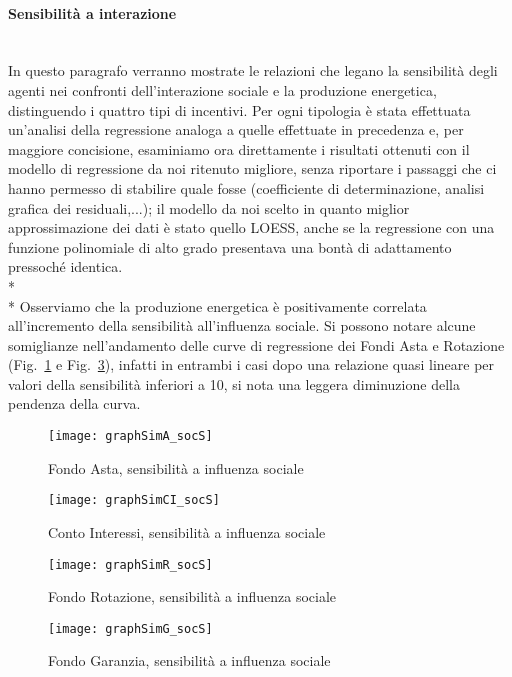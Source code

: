 \documentclass[12pt,a4paper,openright,twoside]{report}
\newcommand{\myparagraph}[1]{\paragraph{#1}\mbox{}\\}
\begin{document}
\myparagraph{Sensibilità a interazione}

In questo paragrafo verranno mostrate le relazioni che legano la sensibilità degli agenti nei confronti dell'interazione sociale e la produzione energetica, distinguendo i quattro tipi di incentivi. Per ogni tipologia è stata effettuata un'analisi della regressione analoga a quelle effettuate in precedenza e, per maggiore concisione, esaminiamo ora direttamente i risultati ottenuti con il modello di regressione da noi ritenuto migliore, senza riportare i passaggi che ci hanno permesso di stabilire quale fosse (coefficiente di determinazione, analisi grafica dei residuali,...); il modello da noi scelto in quanto miglior approssimazione dei dati è stato quello LOESS, anche se la regressione con una funzione polinomiale di alto grado presentava una bontà di adattamento pressoché identica.\\* \\*
Osserviamo che  la produzione energetica è positivamente correlata all'incremento della sensibilità all'influenza sociale. Si possono notare alcune somiglianze nell'andamento delle curve di regressione dei Fondi Asta e Rotazione (Fig.~\ref{graphAsocS} e Fig.~\ref{graphRsocS}), infatti in entrambi i casi dopo una relazione quasi lineare per valori della sensibilità inferiori a 10, si nota una leggera diminuzione della pendenza della curva. 

\begin{figure}[H]
	\centering
	\texttt{[image: graphSimA\_socS]}
	\caption{Fondo Asta, sensibilità a influenza sociale}
	\label{graphAsocS}
\end{figure}

\begin{figure}[hbt]
	\centering
	\texttt{[image: graphSimCI\_socS]}
	\caption{Conto Interessi, sensibilità a influenza sociale}
	\label{graphCIsocS}
\end{figure}

\begin{figure}[H]
	\centering
	\texttt{[image: graphSimR\_socS]}
	\caption{Fondo Rotazione, sensibilità a influenza sociale}
	\label{graphRsocS}
\end{figure}

\begin{figure}[hbt]
	\centering
	\texttt{[image: graphSimG\_socS]}
	\caption{Fondo Garanzia, sensibilità a influenza sociale}
	\label{graphGsocS}
\end{figure}
\end{document}
